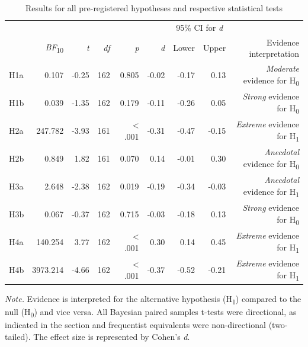 \documentclass[man,floatsintext]{apa6}
\begin{document}
\begin{table}[!htb]
    \centering
    \caption{Results for all pre-registered hypotheses and respective statistical tests}
    \label{tab:preregistered}
    {
        \begin{tabular}{lrrrrrrrr}
            \toprule
         &   &  &  &  &  & \multicolumn{2}{c}{95\% CI for \textit{d}} & \\
            \cline{7-8}
             & \textit{BF}\textsubscript{10} & \textit{t} & \textit{df} & \textit{p} & \textit{d} & Lower & Upper  & Evidence interpretation \\
            \cmidrule(r){1-9}
            H1a & 0.107 & -0.25 & 162 & 0.805 & -0.02 & -0.17 & 0.13 & \textit{Moderate} evidence for H\textsubscript{0} \\
            H1b & 0.039 & -1.35 & 162 & 0.179 & -0.11 & -0.26 & 0.05 & \textit{Strong} evidence for H\textsubscript{0} \\
            H2a & 247.782 & -3.93 & 161 & < .001 & -0.31 & -0.47 & -0.15 & \textit{Extreme} evidence for H\textsubscript{1} \\
            H2b & 0.849 & 1.82 & 161 & 0.070 & 0.14 & -0.01 & 0.30 & \textit{Anecdotal} evidence for H\textsubscript{0} \\
            H3a & 2.648 & -2.38 & 162 & 0.019 & -0.19 & -0.34 & -0.03 & \textit{Anecdotal} evidence for H\textsubscript{1} \\
            H3b & 0.067 & -0.37 & 162 & 0.715 & -0.03 & -0.18 & 0.13 & \textit{Strong} evidence for H\textsubscript{0} \\
            H4a & 140.254 & 3.77 & 162 & < .001 & 0.30 & 0.14 & 0.45 & \textit{Extreme} evidence for H\textsubscript{1} \\
            H4b & 3973.214 & -4.66 & 162 & < .001 & -0.37 & -0.52 & -0.21 & \textit{Extreme} evidence for H\textsubscript{1} \\
            \bottomrule
        \end{tabular}
    }
        \begin{tablenotes}[para]
\footnotesize{\textit{Note.} Evidence is interpreted for the alternative hypothesis (H\textsubscript{1}) compared to the null (H\textsubscript{0}) and vice versa. All Bayesian paired samples t-tests were directional, as indicated in the \textit{} section and frequentist equivalents were non-directional (two-tailed). The effect size is represented by Cohen's \textit{d}.}
\end{tablenotes}
\end{table}
\end{document}

